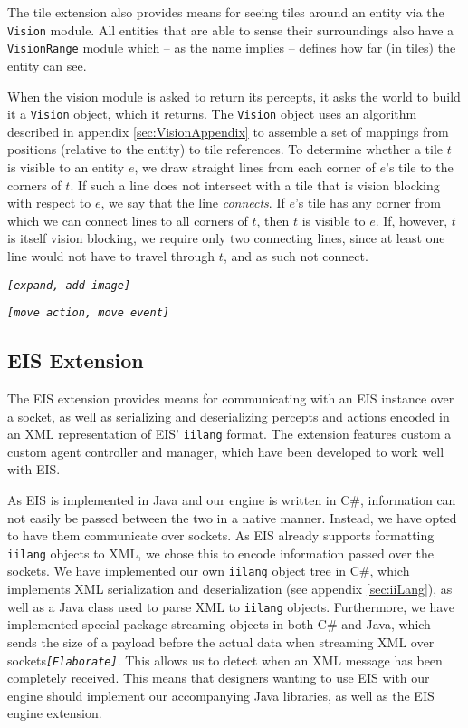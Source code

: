The tile extension also provides means for seeing tiles around an
entity via the \texttt{Vision} module. All entities that are able
to sense their surroundings also have a \texttt{VisionRange} module
which -- as the name implies -- defines how far (in tiles) the entity
can see.

When the vision module is asked to return its percepts, it asks the
world to build it a \texttt{Vision} object, which it returns. The
\texttt{Vision} object uses an algorithm described in appendix \ref{sec:VisionAppendix}
to assemble a set of mappings from positions (relative to the entity)
to tile references. To determine whether a tile $t$ is visible to
an entity $e$, we draw straight lines from each corner of $e$'s
tile to the corners of $t$. If such a line does not intersect with
a tile that is vision blocking with respect to $e$, we say that the
line \emph{connects}. If $e$'s tile has any corner from which we
can connect lines to all corners of $t$, then $t$ is visible to
$e$. If, however, $t$ is itself vision blocking, we require only
two connecting lines, since at least one line would not have to travel
through $t$, and as such not connect.

\texttt{\emph{{[}expand, add image{]}}}

\texttt{\emph{{[}move action, move event{]}}}


\subsection{EIS Extension\label{sub:EIS-Extension}}

The EIS extension provides means for communicating with an EIS instance
over a socket, as well as serializing and deserializing percepts and
actions encoded in an XML representation of EIS' \texttt{iilang} format.
The extension features custom a custom agent controller and manager,
which have been developed to work well with EIS. 

As EIS is implemented in Java and our engine is written in C\#, information
can not easily be passed between the two in a native manner. Instead,
we have opted to have them communicate over sockets. As EIS already
supports formatting \texttt{iilang} objects to XML, we chose this
to encode information passed over the sockets. We have implemented
our own \texttt{iilang} object tree in C\#, which implements XML serialization
and deserialization (see appendix \ref{sec:iiLang}), as well as a
Java class used to parse XML to \texttt{iilang} objects. Furthermore,
we have implemented special package streaming objects in both C\#
and Java, which sends the size of a payload before the actual data
when streaming XML over sockets\texttt{\emph{{[}Elaborate{]}}}. This
allows us to detect when an XML message has been completely received.
This means that designers wanting to use EIS with our engine should
implement our accompanying Java libraries, as well as the EIS engine
extension.

